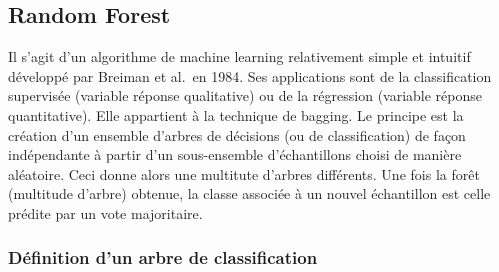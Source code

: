 \documentclass[
]{article}
\newenvironment{Shaded}{\begin{snugshade}}{\end{snugshade}}
\newcommand{\AttributeTok}[1]{\textcolor[rgb]{0.77,0.63,0.00}{#1}}
\newcommand{\CommentTok}[1]{\textcolor[rgb]{0.56,0.35,0.01}{\textit{#1}}}
\newcommand{\ConstantTok}[1]{\textcolor[rgb]{0.00,0.00,0.00}{#1}}
\newcommand{\DecValTok}[1]{\textcolor[rgb]{0.00,0.00,0.81}{#1}}
\newcommand{\FunctionTok}[1]{\textcolor[rgb]{0.00,0.00,0.00}{#1}}
\newcommand{\NormalTok}[1]{#1}
\newcommand{\OtherTok}[1]{\textcolor[rgb]{0.56,0.35,0.01}{#1}}
\newcommand{\SpecialCharTok}[1]{\textcolor[rgb]{0.00,0.00,0.00}{#1}}
\newcommand{\StringTok}[1]{\textcolor[rgb]{0.31,0.60,0.02}{#1}}
\begin{document}
\begin{Shaded}
\end{Shaded}

\hypertarget{random-forest}{%
\subsection{Random Forest}\label{random-forest}}

Il s'agit d'un algorithme de machine learning relativement simple et
intuitif développé par Breiman et al.~en 1984. Ses applications sont de
la classification supervisée (variable réponse qualitative) ou de la
régression (variable réponse quantitative). Elle appartient à la
technique de bagging. Le principe est la création d'un ensemble d'arbres
de décisions (ou de classification) de façon indépendante à partir d'un
sous-ensemble d'échantillons choisi de manière aléatoire. Ceci donne
alors une multitute d'arbres différents. Une fois la forêt (multitude
d'arbre) obtenue, la classe associée à un nouvel échantillon est celle
prédite par un vote majoritaire.

\hypertarget{duxe9finition-dun-arbre-de-classification}{%
\subsubsection{Définition d'un arbre de
classification}\label{duxe9finition-dun-arbre-de-classification}}
\end{document}
